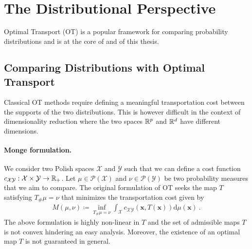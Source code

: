 \section{The Distributional Perspective}\label{sec:dist_perspective_dr}

Optimal Transport (OT) \citep{villani2009optimal,peyre2019computational} is a popular
framework for comparing probability distributions and is at the core of  and  of this thesis.

\subsection{Comparing Distributions with Optimal Transport}\label{sec:background_ot}


Classical OT methods require defining a meaningful transportation cost between the supports of the two distributions. 
This is however difficult in the context of dimensionality reduction where the two spaces $\mathbb{R}^p$ and $\mathbb{R}^d$ have different dimensions.


\paragraph{Monge formulation.}
We consider two Polish spaces $\mathcal{X}$ and $\mathcal{Y}$ such that we can define a cost function $c_{\mathcal{X} \mathcal{Y}} : \mathcal{X} \times \mathcal{Y} \to \mathbb{R}_+$. Let $\mu \in \mathcal{P}(\mathcal{X})$ and $\nu \in \mathcal{P}(\mathcal{Y})$ be two probability measures that we aim to compare.
The original formulation \citep{monge1781memoire} of OT seeks the map $T$ satisfying $T_{\#}\mu = \nu$ that minimizes the transportation cost given by
\begin{align}\label{eq:monge_pb}
	M(\mu, \nu) \coloneqq \inf_{T_{\#}\mu = \nu} \int_{\mathcal{X}} c_{\mathcal{X} \mathcal{Y}}(\bm{x}, T(\bm{x})) \mathrm{d}\mu(\bm{x}) \:.
\end{align}
The above formulation is highly non-linear in $T$ and the set of admissible maps $T$ is not convex hindering an easy analysis. Moreover, the existence of an optimal map $T$ is not guaranteed in general.

